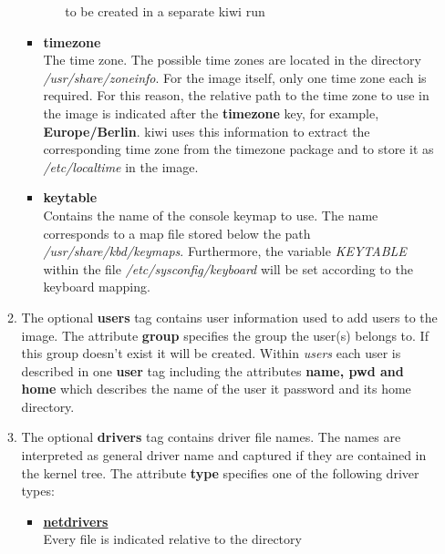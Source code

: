 \begin{itemize}
\begin{enumerate}
\begin{itemize}
\begin{itemize}
                              to be created in a separate kiwi run
					\end{itemize}
              \item \textbf{timezone}\\
                    The time zone. The possible time zones are located in the
                    directory \textit{/usr/share/zoneinfo}. For the image
                    itself, only one time zone each is required. For this
                    reason, the relative path to the time zone to use in the
                    image is indicated after the \textbf{timezone} key, for
                    example, \textbf{Europe/Berlin}. kiwi uses this information
                    to extract the corresponding time zone from the timezone
                    package and to store it as \textit{/etc/localtime} in the
                    image.
              \item \textbf{keytable}\\
                    Contains the name of the console keymap to use. The name
                    corresponds to a map file stored below the path
                    \textit{/usr/share/kbd/keymaps}. Furthermore, the variable
                    \textit{KEYTABLE} within the file
                    \textit{/etc/sysconfig/keyboard} will be set according
                    to the keyboard mapping.
          \end{itemize}
          \item The optional \textbf{users} tag contains user information
                used to add users to the image. The attribute \textbf{group}
                specifies the group the user(s) belongs to. If this group
                doesn't exist it will be created. Within \textit{users}
                each user is described in one \textbf{user} tag including the
                attributes \textbf{name, pwd and home} which describes the
                name of the user it password and its home directory.
          \item The optional \textbf{drivers} tag contains driver file names.
                The names are interpreted as general driver name and captured
                if they are contained in the kernel tree. The attribute
                \textbf{type} specifies one of the following driver types:
                \begin{itemize}
                \item \textbf{\underline{netdrivers}}\\
                      Every file is indicated relative to the directory\\

\end{itemize}
\end{enumerate}
\end{itemize}

